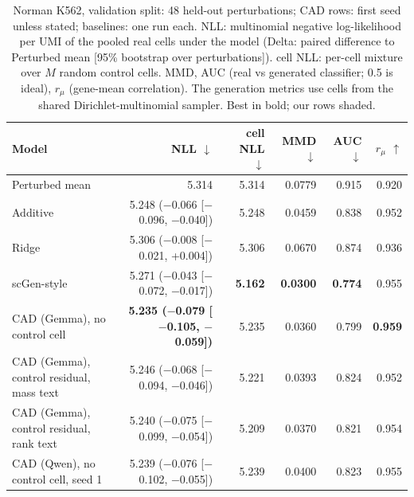 \begin{table}[htbp]
\centering
\small
\setlength{\tabcolsep}{3.5pt}
\begin{tabular}{lrrrrr}
\toprule
Model & NLL $\downarrow$ & cell NLL $\downarrow$ & MMD $\downarrow$ & AUC $\downarrow$ & $r_\mu$ $\uparrow$ \\
\midrule
Perturbed mean & 5.314 & 5.314 & 0.0779 & 0.915 & 0.920 \\
Additive & 5.248 ($-$0.066 [$-$0.096, $-$0.040]) & 5.248 & 0.0459 & 0.838 & 0.952 \\
Ridge & 5.306 ($-$0.008 [$-$0.021, +0.004]) & 5.306 & 0.0670 & 0.874 & 0.936 \\
scGen-style & 5.271 ($-$0.043 [$-$0.072, $-$0.017]) & \textbf{5.162} & \textbf{0.0300} & \textbf{0.774} & 0.955 \\
\rowcolor{ours}CAD (Gemma), no control cell & \textbf{5.235 ($-$0.079 [$-$0.105, $-$0.059])} & 5.235 & 0.0360 & 0.799 & \textbf{0.959} \\
\rowcolor{ours}CAD (Gemma), control residual, mass text & 5.246 ($-$0.068 [$-$0.094, $-$0.046]) & 5.221 & 0.0393 & 0.824 & 0.952 \\
\rowcolor{ours}CAD (Gemma), control residual, rank text & 5.240 ($-$0.075 [$-$0.099, $-$0.054]) & 5.209 & 0.0370 & 0.821 & 0.954 \\
\rowcolor{ours}CAD (Qwen), no control cell, seed 1 & 5.239 ($-$0.076 [$-$0.102, $-$0.055]) & 5.239 & 0.0400 & 0.823 & 0.955 \\
\bottomrule
\end{tabular}
\caption{Norman K562, validation split: 48 held-out perturbations; CAD rows: first seed unless stated; baselines: one run each. NLL: multinomial negative log-likelihood per UMI of the pooled real cells under the model (Delta: paired difference to Perturbed mean [95\% bootstrap over perturbations]). cell NLL: per-cell mixture over $M$ random control cells. MMD, AUC (real vs generated classifier; 0.5 is ideal), $r_\mu$ (gene-mean correlation). The generation metrics use cells from the shared Dirichlet-multinomial sampler. Best in bold; our rows shaded.}
\label{tab:val_pert}
\end{table}